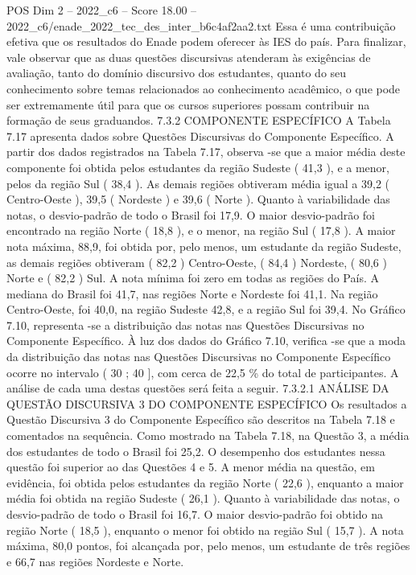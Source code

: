 \begin{textsample}{POS Dim 2 – 2022\_c6 – Score 18.00 – 2022\_c6/enade\_2022\_tec\_des\_inter\_b6c4af2aa2.txt}
Essa é uma contribuição efetiva que os resultados do Enade podem oferecer às IES do país.
Para finalizar, vale observar que as duas questões discursivas atenderam às exigências de avaliação, tanto do domínio discursivo dos estudantes, quanto do seu conhecimento sobre temas relacionados ao conhecimento acadêmico, o que pode ser extremamente útil para que os cursos superiores possam contribuir na formação de seus graduandos. 7.3.2 COMPONENTE ESPECÍFICO A Tabela 7.17 apresenta dados sobre Questões Discursivas do Componente Específico.
A partir dos dados registrados na Tabela 7.17, observa -se que a maior média deste componente foi obtida pelos estudantes da região Sudeste ( 41,3 ), e a menor, pelos da região Sul ( 38,4 ).
As demais regiões obtiveram média igual a 39,2 ( Centro-Oeste ), 39,5 ( Nordeste ) e 39,6 ( Norte ).
Quanto à variabilidade das notas, o desvio-padrão de todo o Brasil foi 17,9.
O maior desvio-padrão foi encontrado na região Norte ( 18,8 ), e o menor, na região Sul ( 17,8 ).
A maior nota máxima, 88,9, foi obtida por, pelo menos, um estudante da região Sudeste, as demais regiões obtiveram ( 82,2 ) Centro-Oeste, ( 84,4 ) Nordeste, ( 80,6 ) Norte e ( 82,2 ) Sul.
A nota mínima foi zero em todas as regiões do País.
A mediana do Brasil foi 41,7, nas regiões Norte e Nordeste foi 41,1.
Na região Centro-Oeste, foi 40,0, na região Sudeste 42,8, e a região Sul foi 39,4.
No Gráfico 7.10, representa -se a distribuição das notas nas Questões Discursivas no Componente Específico.
À luz dos dados do Gráfico 7.10, verifica -se que a moda da distribuição das notas nas Questões Discursivas no Componente Específico ocorre no intervalo ( 30 ; 40 ], com cerca de 22,5 \% do total de participantes.
A análise de cada uma destas questões será feita a seguir. 7.3.2.1 ANÁLISE DA QUESTÃO DISCURSIVA 3 DO COMPONENTE ESPECÍFICO Os resultados a Questão Discursiva 3 do Componente Específico são descritos na Tabela 7.18 e comentados na sequência.
Como mostrado na Tabela 7.18, na Questão 3, a média dos estudantes de todo o Brasil foi 25,2.
O desempenho dos estudantes nessa questão foi superior ao das Questões 4 e 5.
A menor média na questão, em evidência, foi obtida pelos estudantes da região Norte ( 22,6 ), enquanto a maior média foi obtida na região Sudeste ( 26,1 ).
Quanto à variabilidade das notas, o desvio-padrão de todo o Brasil foi 16,7.
O maior desvio-padrão foi obtido na região Norte ( 18,5 ), enquanto o menor foi obtido na região Sul ( 15,7 ).
A nota máxima, 80,0 pontos, foi alcançada por, pelo menos, um estudante de três regiões e 66,7 nas regiões Nordeste e Norte.

\end{textsample}
